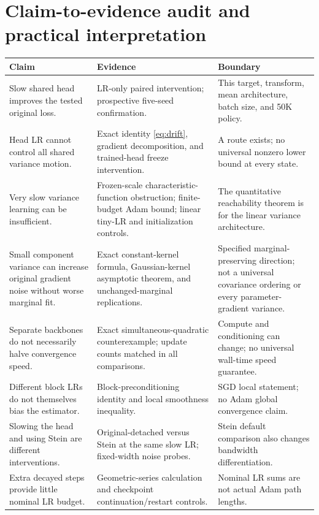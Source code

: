 \documentclass[11pt,a4paper]{article}
\begin{document}
\clearpage
\section{Claim-to-evidence audit and practical interpretation}
\FloatBarrier
{\small\begin{longtable}{@{}p{4.3cm}p{6.2cm}p{5cm}@{}}\toprule Claim & Evidence & Boundary \\ \midrule\endhead
Slow shared head improves the tested original loss. & LR-only paired intervention; prospective five-seed confirmation. & This target, transform, mean architecture, batch size, and 50K policy. \\
Head LR cannot control all shared variance motion. & Exact identity \eqref{eq:drift}, gradient decomposition, and trained-head freeze intervention. & A route exists; no universal nonzero lower bound at every state. \\
Very slow variance learning can be insufficient. & Frozen-scale characteristic-function obstruction; finite-budget Adam bound; linear tiny-LR and initialization controls. & The quantitative reachability theorem is for the linear variance architecture. \\
Small component variance can increase original gradient noise without worse marginal fit. & Exact constant-kernel formula, Gaussian-kernel asymptotic theorem, and unchanged-marginal replications. & Specified marginal-preserving direction; not a universal covariance ordering or every parameter-gradient variance. \\
Separate backbones do not necessarily halve convergence speed. & Exact simultaneous-quadratic counterexample; update counts matched in all comparisons. & Compute and conditioning can change; no universal wall-time speed guarantee. \\
Different block LRs do not themselves bias the estimator. & Block-preconditioning identity and local smoothness inequality. & SGD local statement; no Adam global convergence claim. \\
Slowing the head and using Stein are different interventions. & Original-detached versus Stein at the same slow LR; fixed-width noise probes. & Stein default comparison also changes bandwidth differentiation. \\
Extra decayed steps provide little nominal LR budget. & Geometric-series calculation and checkpoint continuation/restart controls. & Nominal LR sums are not actual Adam path lengths. \\\bottomrule\end{longtable}}
\end{document}
